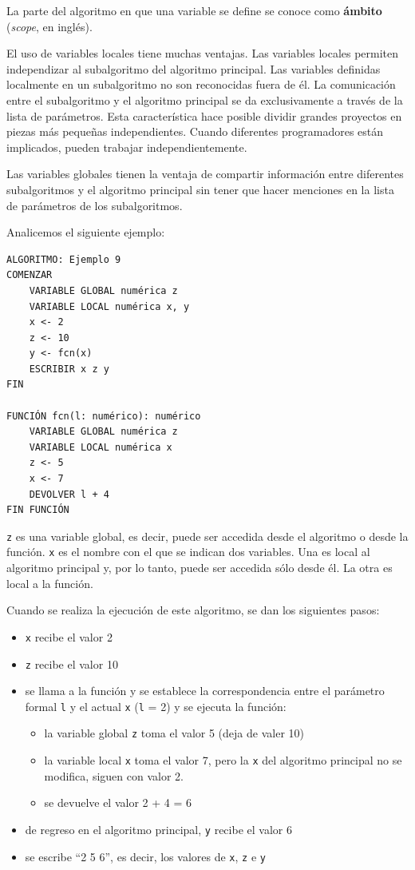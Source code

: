 \documentclass[]{book}
\providecommand{\tightlist}{%
  \setlength{\itemsep}{0pt}\setlength{\parskip}{0pt}}
\begin{document}
La parte del algoritmo en que una variable se define se conoce como
\textbf{ámbito} (\emph{scope}, en inglés).

El uso de variables locales tiene muchas ventajas. Las variables locales
permiten independizar al subalgoritmo del algoritmo principal. Las
variables definidas localmente en un subalgoritmo no son reconocidas
fuera de él. La comunicación entre el subalgoritmo y el algoritmo
principal se da exclusivamente a través de la lista de parámetros. Esta
característica hace posible dividir grandes proyectos en piezas más
pequeñas independientes. Cuando diferentes programadores están
implicados, pueden trabajar independientemente.

Las variables globales tienen la ventaja de compartir información entre
diferentes subalgoritmos y el algoritmo principal sin tener que hacer
menciones en la lista de parámetros de los subalgoritmos.

Analicemos el siguiente ejemplo:

\begin{verbatim}
ALGORITMO: Ejemplo 9
COMENZAR
    VARIABLE GLOBAL numérica z
    VARIABLE LOCAL numérica x, y
    x <- 2
    z <- 10
    y <- fcn(x)
    ESCRIBIR x z y
FIN

FUNCIÓN fcn(l: numérico): numérico
    VARIABLE GLOBAL numérica z
    VARIABLE LOCAL numérica x
    z <- 5
    x <- 7
    DEVOLVER l + 4
FIN FUNCIÓN
\end{verbatim}

\texttt{z} es una variable global, es decir, puede ser accedida desde el
algoritmo o desde la función. \texttt{x} es el nombre con el que se
indican dos variables. Una es local al algoritmo principal y, por lo
tanto, puede ser accedida sólo desde él. La otra es local a la función.

Cuando se realiza la ejecución de este algoritmo, se dan los siguientes
pasos:

\begin{itemize}
\item
  \texttt{x} recibe el valor 2
\item
  \texttt{z} recibe el valor 10
\item
  se llama a la función y se establece la correspondencia entre el
  parámetro formal \texttt{l} y el actual \texttt{x} (\texttt{l} = 2) y
  se ejecuta la función:

  \begin{itemize}
  \tightlist
  \item
    la variable global \texttt{z} toma el valor 5 (deja de valer 10)
  \item
    la variable local \texttt{x} toma el valor 7, pero la \texttt{x} del
    algoritmo principal no se modifica, siguen con valor 2.
  \item
    se devuelve el valor 2 + 4 = 6
  \end{itemize}
\item
  de regreso en el algoritmo principal, \texttt{y} recibe el valor 6
\item
  se escribe ``2 5 6'', es decir, los valores de \texttt{x}, \texttt{z}
  e \texttt{y}
\end{itemize}
\end{document}
